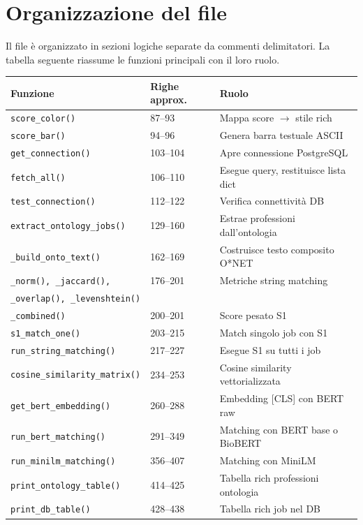 \documentclass[12pt, a4paper]{report}
\begin{document}
\section{Organizzazione del file}

Il file è organizzato in sezioni logiche separate da commenti
delimitatori. La tabella seguente riassume le funzioni principali con
il loro ruolo.

\begin{longtable}{p{5.5cm} p{2.5cm} p{6cm}}
\toprule
\textbf{Funzione} & \textbf{Righe approx.} & \textbf{Ruolo} \\
\midrule
\endhead
\texttt{score\_color()} & 87--93 & Mappa score $\to$ stile rich \\
\texttt{score\_bar()} & 94--96 & Genera barra testuale ASCII \\
\texttt{get\_connection()} & 103--104 & Apre connessione PostgreSQL \\
\texttt{fetch\_all()} & 106--110 & Esegue query, restituisce lista dict \\
\texttt{test\_connection()} & 112--122 & Verifica connettività DB \\
\texttt{extract\_ontology\_jobs()} & 129--160 & Estrae professioni dall'ontologia \\
\texttt{\_build\_onto\_text()} & 162--169 & Costruisce testo composito O*NET \\
\texttt{\_norm(), \_jaccard(),} & 176--201 & Metriche string matching \\
\texttt{\_overlap(), \_levenshtein()} & & \\
\texttt{\_combined()} & 200--201 & Score pesato S1 \\
\texttt{s1\_match\_one()} & 203--215 & Match singolo job con S1 \\
\texttt{run\_string\_matching()} & 217--227 & Esegue S1 su tutti i job \\
\texttt{cosine\_similarity\_matrix()} & 234--253 & Cosine similarity vettorializzata \\
\texttt{get\_bert\_embedding()} & 260--288 & Embedding [CLS] con BERT raw \\
\texttt{run\_bert\_matching()} & 291--349 & Matching con BERT base o BioBERT \\
\texttt{run\_minilm\_matching()} & 356--407 & Matching con MiniLM \\
\texttt{print\_ontology\_table()} & 414--425 & Tabella rich professioni ontologia \\
\texttt{print\_db\_table()} & 428--438 & Tabella rich job nel DB \\

\end{longtable}
\end{document}
